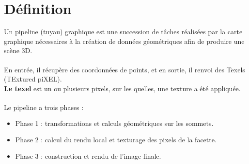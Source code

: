 \section{Définition}
Un pipeline (tuyau) graphique est une succession de tâches réalisées par la carte graphique nécessaires à la création de données géométriques afin de produire une scène 3D.
\\\\
En entrée, il récupère des coordonnées de points, et en sortie, il renvoi des Texels (TExtured piXEL).
\\
\textbf{Le texel} est un ou plusieurs pixels, sur les quelles, une texture a été appliquée.
\\\\
Le pipeline a trois phases : 
\begin{itemize}
  \item Phase 1 : transformations et calculs géométriques sur les sommets.
  \item Phase 2 : calcul du rendu local et texturage des pixels de la facette.
  \item Phase 3 : construction et rendu de l'image finale.\end{itemize}

